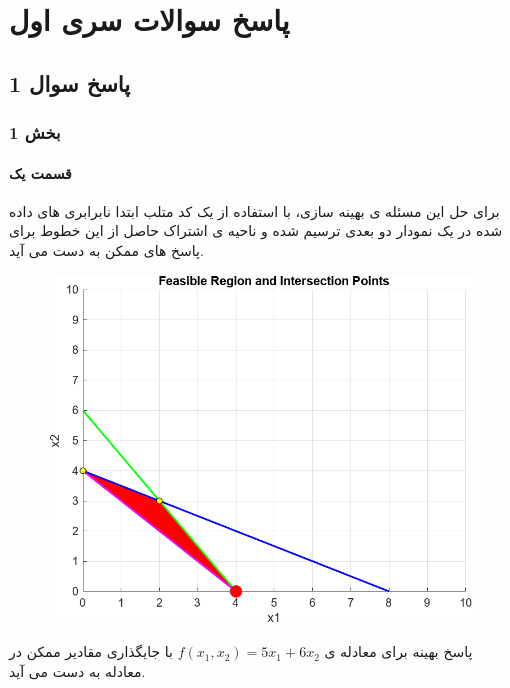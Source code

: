 
\chapter{پاسخ سوالات سری اول}

\section{ پاسخ سوال 1}

\subsection{بخش 1}

\subsubsection{قسمت یک}
برای حل این مسئله ی بهینه سازی، با استفاده از یک کد متلب ابتدا نابرابری های داده شده در یک نمودار دو بعدی ترسیم شده و ناحیه ی اشتراک حاصل از این خطوط  برای پاسخ های ممکن به دست می آید.



\begin{figure}
	\centering
	\includegraphics[width=1\linewidth]{../img/Q1_1}
	\caption{}
	\label{fig:q11}
\end{figure}

پاسخ بهینه برای معادله ی 
	\( f(x_1, x_2) = 5x_1 + 6x_2 \)
با جایگذاری مقادیر ممکن در معادله به دست می آید.
	
